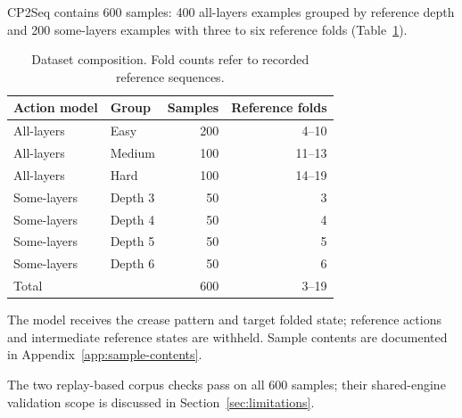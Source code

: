 CP2Seq contains 600 samples: 400 all-layers examples grouped by reference depth and 200
some-layers examples with three to six reference folds (Table~\ref{tab:dataset-statistics}).

\begin{table}[h]
\centering
\caption{Dataset composition. Fold counts refer to recorded reference sequences.}
\label{tab:dataset-statistics}
\begin{tabular}{llrr}
\hline
Action model & Group & Samples & Reference folds \\
\hline
All-layers & Easy & 200 & 4--10 \\
All-layers & Medium & 100 & 11--13 \\
All-layers & Hard & 100 & 14--19 \\
Some-layers & Depth 3 & 50 & 3 \\
Some-layers & Depth 4 & 50 & 4 \\
Some-layers & Depth 5 & 50 & 5 \\
Some-layers & Depth 6 & 50 & 6 \\
\hline
Total & & 600 & 3--19 \\
\hline
\end{tabular}
\end{table}

The model receives the crease pattern and target folded state; reference actions and
intermediate reference states are withheld. Sample contents are documented in
Appendix~\ref{app:sample-contents}.

\label{sec:cp2seq-verify}
The two replay-based corpus checks pass on all 600 samples; their shared-engine
validation scope is discussed in Section~\ref{sec:limitations}.



\label{sec:cp2seq-limits}

